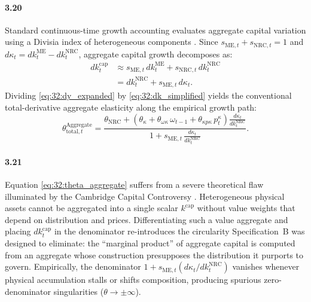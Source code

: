 \paragraph{3.20}
Standard continuous-time growth accounting evaluates aggregate capital variation using a Divisia index of heterogeneous components \citep{Divisia1925}. Since $s_{\text{ME},t} + s_{\text{NRC},t} = 1$ and $d\kappa_t = dk^{\text{ME}}_t - dk^{\text{NRC}}_t$, aggregate capital growth decomposes as:
\begin{align}
	dk^{\text{cap}}_t &\approx s_{\text{ME},t}\, dk^{\text{ME}}_t
	+ s_{\text{NRC},t}\, dk^{\text{NRC}}_t
	\label{eq:32:dk_divisia} \\
	&= dk^{\text{NRC}}_t + s_{\text{ME},t}\, d\kappa_t.
	\label{eq:32:dk_simplified}
\end{align}
Dividing \eqref{eq:32:dy_expanded} by \eqref{eq:32:dk_simplified} yields the conventional total-derivative aggregate elasticity along the empirical growth path:
\begin{equation}
	\theta^{\text{Aggregate}}_{\text{total},t}
	= \frac{\theta_{\text{NRC}}
		+ \left(\theta_\kappa + \theta_{\omega\kappa}\, \omega_{t-1}
		+ \theta_{\kappa p\kappa}\, p^\kappa_t\right)
		\frac{d\kappa_t}{dk^{\text{NRC}}_t}}
	{1 + s_{\text{ME},t}\, \frac{d\kappa_t}{dk^{\text{NRC}}_t}}.
	\label{eq:32:theta_aggregate}
\end{equation}

\paragraph{3.21}
Equation \eqref{eq:32:theta_aggregate} suffers from a severe theoretical flaw illuminated by the Cambridge Capital Controversy \citet{Robinson1953,Sraffa1960}. Heterogeneous physical assets cannot be aggregated into a single scalar $k^{\text{cap}}$ without value weights that depend on distribution and prices. Differentiating such a value aggregate and placing $dk^{\text{cap}}_t$ in the denominator re-introduces the circularity Specification~B was designed to eliminate: the ``marginal product'' of aggregate capital is computed from an aggregate whose construction presupposes the distribution it purports to govern. Empirically, the denominator $1 + s_{\text{ME},t}(d\kappa_t / dk^{\text{NRC}}_t)$ vanishes whenever physical accumulation stalls or shifts composition, producing spurious zero-denominator singularities ($\theta \to \pm\infty$).

